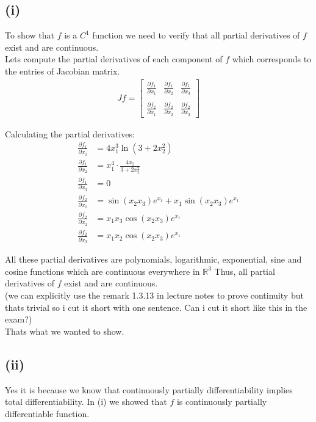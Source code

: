 \documentclass{article}
\begin{document}
\subsection*{(i)}
To show that \(f\) is a \(C^1\) function we need to verify that all partial derivatives of \(f\) exist and are continuous. \\
Lets compute the partial derivatives of each component of \(f\) which corresponds to the entries of Jacobian matrix.
\begin{align*}
   Jf = \begin{bmatrix}
      \frac{\partial f_1}{\partial x_1} & \frac{\partial f_1}{\partial x_2} & \frac{\partial f_1}{\partial x_3} \\
      \\
      \frac{\partial f_2}{\partial x_1} & \frac{\partial f_2}{\partial x_2} & \frac{\partial f_2}{\partial x_3}
   \end{bmatrix}
\end{align*}

Calculating the partial derivatives:
\begin{align*}
   \frac{\partial f_1}{\partial x_1} &= 4x_1^3 \ln(3 + 2x_2^2) \\
   \frac{\partial f_1}{\partial x_2} &= x_1^4 \cdot \frac{4x_2}{3 + 2x_2^2} \\
   \frac{\partial f_1}{\partial x_3} &= 0 \\
   \frac{\partial f_2}{\partial x_1} &= \sin(x_2 x_3) e^{x_1} + x_1 \sin(x_2 x_3) e^{x_1} \\
   \frac{\partial f_2}{\partial x_2} &= x_1 x_3 \cos(x_2 x_3) e^{x_1} \\
   \frac{\partial f_2}{\partial x_3} &= x_1 x_2 \cos(x_2 x_3) e^{x_1}
\end{align*}

All these partial derivatives are polynomials, logarithmic, exponential, sine and cosine functions which are continuous everywhere in \( \mathbb{R}^3 \)
Thus, all partial derivatives of \(f\) exist and are continuous. \\
(we can explicitly use the remark 1.3.13 in lecture notes to prove continuity but thats trivial so i cut it short with one sentence. Can i cut it short like this in the exam?) \\
Thats what we wanted to show.

\subsection*{(ii)}
Yes it is because we know that continuously partially differentiability implies total differentiability. In (i) we showed that \(f\) is continuously partially differentiable function.
\end{document}
